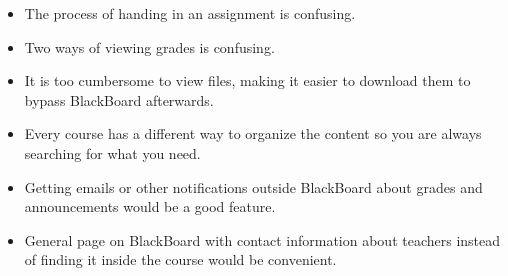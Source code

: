 \begin{itemize}
	\item The process of handing in an assignment is confusing.
	\item Two ways of viewing grades is confusing.
	\item It is too cumbersome to view files, making it easier to download them to bypass BlackBoard afterwards.
	\item Every course has a different way to organize the content so you are always searching for what you need.
	\item Getting emails or other notifications outside BlackBoard about grades and announcements would be a good feature.
	\item General page on BlackBoard with contact information about teachers instead of finding it inside the course would be convenient.
\end{itemize}


\begin{thebibliography}{9}
	
\end{thebibliography}


\appendix



